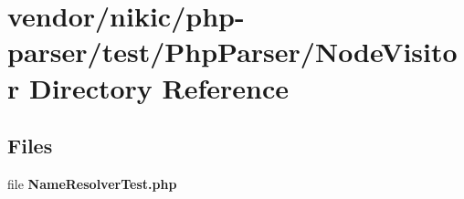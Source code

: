 \section{vendor/nikic/php-\/parser/test/\+Php\+Parser/\+Node\+Visitor Directory Reference}
\label{dir_e0640d987dae88772c11cae4eb505e76}
\subsection*{Files}
\begin{DoxyCompactItemize}
\item 
file {\bf Name\+Resolver\+Test.\+php}
\end{DoxyCompactItemize}
